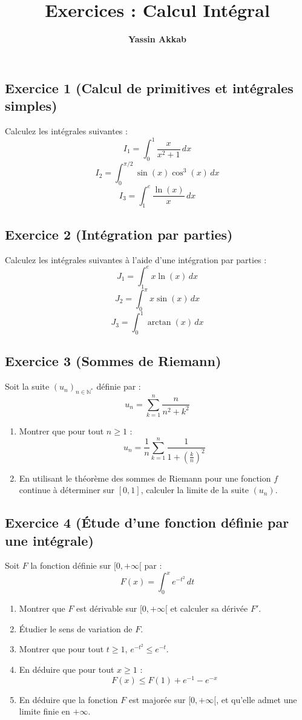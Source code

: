 \documentclass{article}
\title{\textbf{Exercices : Calcul Intégral}}
\author{\textbf{Yassin Akkab}}
\begin{document}
	
	\maketitle
	
	\subsection*{Exercice 1 (Calcul de primitives et intégrales simples)}
	Calculez les intégrales suivantes :
	\[ I_1 = \int_0^1 \frac{x}{x^2 + 1} \, dx \]
	\[ I_2 = \int_0^{\pi/2} \sin(x)\cos^3(x) \, dx \]
	\[ I_3 = \int_1^e \frac{\ln(x)}{x} \, dx \]
	
	\subsection*{Exercice 2 (Intégration par parties)}
	Calculez les intégrales suivantes à l'aide d'une intégration par parties :
	\[ J_1 = \int_1^e x \ln(x) \, dx \]
	\[ J_2 = \int_0^\pi x \sin(x) \, dx \]
	\[ J_3 = \int_0^1 \arctan(x) \, dx \]
	
	\subsection*{Exercice 3 (Sommes de Riemann)}
	Soit la suite $(u_n)_{n \in \mathbb{N}^*}$ définie par :
	\[ u_n = \sum_{k=1}^n \frac{n}{n^2 + k^2} \]
	\begin{enumerate}
		\item Montrer que pour tout $n \ge 1$ :
		\[ u_n = \frac{1}{n} \sum_{k=1}^n \frac{1}{1 + \left(\frac{k}{n}\right)^2} \]
		\item En utilisant le théorème des sommes de Riemann pour une fonction $f$ continue à déterminer sur $[0, 1]$, calculer la limite de la suite $(u_n)$.
	\end{enumerate}
	
	\subsection*{Exercice 4 (Étude d'une fonction définie par une intégrale)}
	Soit $F$ la fonction définie sur $[0, +\infty[$ par :
	\[ F(x) = \int_0^x e^{-t^2} \, dt \]
	\begin{enumerate}
		\item Montrer que $F$ est dérivable sur $[0, +\infty[$ et calculer sa dérivée $F'$.
		\item Étudier le sens de variation de $F$.
		\item Montrer que pour tout $t \ge 1$, $e^{-t^2} \le e^{-t}$.
		\item En déduire que pour tout $x \ge 1$ :
		\[ F(x) \le F(1) + e^{-1} - e^{-x} \]
		\item En déduire que la fonction $F$ est majorée sur $[0, +\infty[$, et qu'elle admet une limite finie en $+\infty$.
	\end{enumerate}
	
\end{document}

